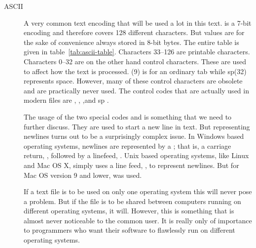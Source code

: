 \begin{description}
\item[ASCII] A very common text encoding that will be used a lot in
  this text. \ascii is a \mbox{7-bit} encoding and therefore covers
  128 different characters. But \ascii values are for the sake of
  convenience always stored in 8-bit bytes. The entire \ascii table is
  given in table~\ref{tab:ascii-table}\cite{rfc20}. Characters 33--126
  are printable characters. Characters 0--32 are on the other hand
  control characters. These are used to affect how the text is
  processed. \htab(9) is for an ordinary tab while {\acronymstyle
    sp}(32) represents space. However, many of these control
  characters are obsolete and are practically never used. The control
  codes that are actually used in modern files are \nul, \htab,
  \lf,\cret and {\acronymstyle sp} \cite{maini2007digital}.

  The usage of the two special codes \cret and \lf is something that
  we need to further discuss. They are used to start a new line in
  text. But representing newlines turns out to be a surprisingly
  complex issue. In Windows based operating systems, newlines are
  represented by a \crlf; that is, a carriage return, \cret, followed
  by a linefeed, \lf. Unix based operating systems, like Linux and Mac
  OS X, simply uses a line feed, \lf, to represent newlines. But for
  Mac OS version 9 and lower, \cret was
  used\cite{robbins:_common_newline,noria:_under_newlin_oreilly,editor:_end_line_story_rfc,tancig01:_apart_no_more_newline,corporation08:_creat_telep_applic_both_window_linux}.

  If a text file is to be used on only one operating system this will
  never pose a problem. But if the file is to be shared between
  computers running on different operating systems, it will. However,
  this is something that is almost never noticeable to the common
  user. It is really only of importance to programmers who want their
  software to flawlessly run on different operating systems.


\end{description}
